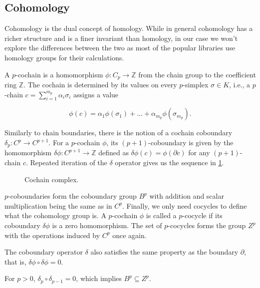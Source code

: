 \subsection{Cohomology}
Cohomology is the dual concept of homology. While in general cohomology has a richer structure and is a finer invariant than homology, in our case we won't explore the differences between the two as most of the popular libraries use homology groups for their calculations.

A $p$-cochain is a homomorphism $\phi: C_{p} \to \mathbb{Z}$ from the chain group to the coefficient ring $\mathbb{Z}$. The cochain is determined by its values on every $p$-simplex $\sigma \in K$, i.e., a $p$-chain $c = \sum_{i=1}^{m_{p}}\alpha_{i}\sigma_{i}$ assigns a value

\begin{equation*}
  \phi(c) = \alpha_{1}\phi(\sigma_{1}) + \ldots + \alpha_{m_{p}}\phi(\sigma_{m_{p}}).
\end{equation*}

Similarly to chain boundaries, there is the notion of a cochain coboundary $\delta_{p}: C^{p} \to C^{p+1}$. For a $p$-cochain $\phi$, its $(p+1)$-coboundary is given by the homomorphism $\delta \phi: C^{p+1} \to \mathbb{Z}$ defined as $\delta \phi(c) = \phi(\partial c)$ for any $(p+1)$-chain $c$. Repeated iteration of the $\delta$ operator gives us the sequence in \ref{fig:cohomology}.

\begin{figure}[h]
  \centering
  \caption{Cochain complex.}
  \label{fig:cohomology}
\end{figure}

\noindent
$p$-coboundaries form the coboundary group $B^{p}$ with addition and scalar multiplication being the same as in $C^{p}$. Finally, we only need cocycles to define what the cohomology group is. A $p$-cochain $\phi$ is called a $p$-cocycle if its coboundary $\delta \phi$ is a zero homomorphism. The set of $p$-cocycles forms the group $Z^{p}$ with the operations induced by $C^{p}$ once again.

The coboundary operator $\delta$ also satisfies the same property as the boundary $\partial$, that is, $\delta \phi \circ \delta \phi = 0$.

\begin{lemma}
  For $p >0$, $\delta_{p} \circ \delta_{p-1} = 0$, which implies $B^{p} \subseteq Z^{p}$.
\end{lemma}

